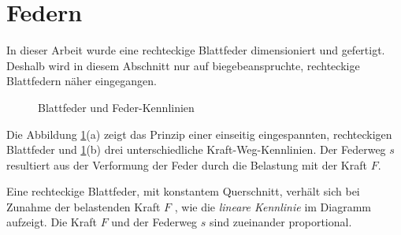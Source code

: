 \newpage
\section{Federn}
\label{sec:Federn}


In dieser Arbeit wurde eine rechteckige Blattfeder dimensioniert und gefertigt. Deshalb wird in diesem Abschnitt nur auf biegebeanspruchte, rechteckige Blattfedern näher eingegangen. 

\begin{figure}[htb]
\centering
{}
\caption{Blattfeder und Feder-Kennlinien \citep{Wittel2011}}
\label{fig:Federdiagramm}
\end{figure}

Die Abbildung \ref{fig:Federdiagramm}(a) zeigt das Prinzip einer einseitig eingespannten, rechteckigen Blattfeder und \ref{fig:Federdiagramm}(b) drei unterschiedliche Kraft-Weg-Kennlinien. Der Federweg $s$ resultiert aus der Verformung der Feder durch die Belastung mit der Kraft $F$.

Eine rechteckige Blattfeder, mit konstantem Querschnitt, verhält sich bei Zunahme der belastenden Kraft $F$ , wie die \textit{lineare Kennlinie} im Diagramm aufzeigt. Die Kraft $F$ und der Federweg $s$ sind zueinander proportional.

